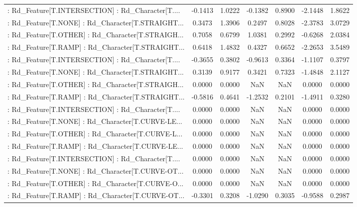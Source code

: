 \begin{longtable}{p{4cm}cccccc}
 : Rd\_Feature[T.INTERSECTION] : Rd\_Character[T.... & -0.1413 &    1.0222 & -0.1382 &       0.8900 & -2.1448 &  1.8622 \\
 : Rd\_Feature[T.NONE] : Rd\_Character[T.STRAIGHT... &  0.3473 &    1.3906 &  0.2497 &       0.8028 & -2.3783 &  3.0729 \\
 : Rd\_Feature[T.OTHER] : Rd\_Character[T.STRAIGH... &  0.7058 &    0.6799 &  1.0381 &       0.2992 & -0.6268 &  2.0384 \\
 : Rd\_Feature[T.RAMP] : Rd\_Character[T.STRAIGHT... &  0.6418 &    1.4832 &  0.4327 &       0.6652 & -2.2653 &  3.5489 \\
 : Rd\_Feature[T.INTERSECTION] : Rd\_Character[T.... & -0.3655 &    0.3802 & -0.9613 &       0.3364 & -1.1107 &  0.3797 \\
 : Rd\_Feature[T.NONE] : Rd\_Character[T.STRAIGHT... &  0.3139 &    0.9177 &  0.3421 &       0.7323 & -1.4848 &  2.1127 \\
 : Rd\_Feature[T.OTHER] : Rd\_Character[T.STRAIGH... &  0.0000 &    0.0000 &     NaN &          NaN &  0.0000 &  0.0000 \\
 : Rd\_Feature[T.RAMP] : Rd\_Character[T.STRAIGHT... & -0.5816 &    0.4641 & -1.2532 &       0.2101 & -1.4911 &  0.3280 \\
 : Rd\_Feature[T.INTERSECTION] : Rd\_Character[T.... &  0.0000 &    0.0000 &     NaN &          NaN &  0.0000 &  0.0000 \\
 : Rd\_Feature[T.NONE] : Rd\_Character[T.CURVE-LE... &  0.0000 &    0.0000 &     NaN &          NaN &  0.0000 &  0.0000 \\
 : Rd\_Feature[T.OTHER] : Rd\_Character[T.CURVE-L... &  0.0000 &    0.0000 &     NaN &          NaN &  0.0000 &  0.0000 \\
 : Rd\_Feature[T.RAMP] : Rd\_Character[T.CURVE-LE... &  0.0000 &    0.0000 &     NaN &          NaN &  0.0000 &  0.0000 \\
 : Rd\_Feature[T.INTERSECTION] : Rd\_Character[T.... &  0.0000 &    0.0000 &     NaN &          NaN &  0.0000 &  0.0000 \\
 : Rd\_Feature[T.NONE] : Rd\_Character[T.CURVE-OT... &  0.0000 &    0.0000 &     NaN &          NaN &  0.0000 &  0.0000 \\
 : Rd\_Feature[T.OTHER] : Rd\_Character[T.CURVE-O... &  0.0000 &    0.0000 &     NaN &          NaN &  0.0000 &  0.0000 \\
 : Rd\_Feature[T.RAMP] : Rd\_Character[T.CURVE-OT... & -0.3301 &    0.3208 & -1.0290 &       0.3035 & -0.9588 &  0.2987 \\

\end{longtable}
